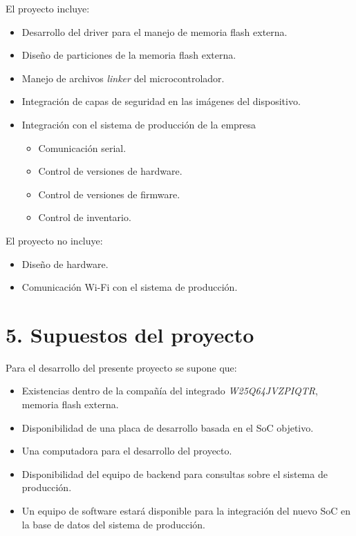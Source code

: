 \documentclass[
11pt, %
]{charter}
\begin{document}
El proyecto incluye:
\begin{itemize}
	\item Desarrollo del driver para el manejo de memoria flash externa.
	\item Diseño de particiones de la memoria flash externa.
	\item Manejo de archivos \textit{linker} del microcontrolador.
	\item Integración de capas de seguridad en las imágenes del dispositivo.
	\item Integración con el sistema de producción de la empresa
		\begin{itemize}
		\item Comunicación serial.
		\item Control de versiones de hardware.
		\item Control de versiones de firmware.
		\item Control de inventario.
		\end{itemize}	
\end{itemize}

El proyecto no incluye:
\begin{itemize}
	\item Diseño de hardware.
	\item Comunicación Wi-Fi con el sistema de producción.
\end{itemize}

\section{5. Supuestos del proyecto}
\label{sec:supuestos}

Para el desarrollo del presente proyecto se supone que:

\begin{itemize}
	\item Existencias dentro de la compañía del integrado \textit{W25Q64JVZPIQTR}, memoria flash externa.
	\item Disponibilidad de una placa de desarrollo basada en el SoC objetivo.
	\item Una computadora para el desarrollo del proyecto.
	\item Disponibilidad del equipo de backend para consultas sobre el sistema de producción.
	\item Un equipo de software estará disponible para la integración del nuevo SoC en la base de datos del sistema de producción.
\end{itemize}
\end{document}
